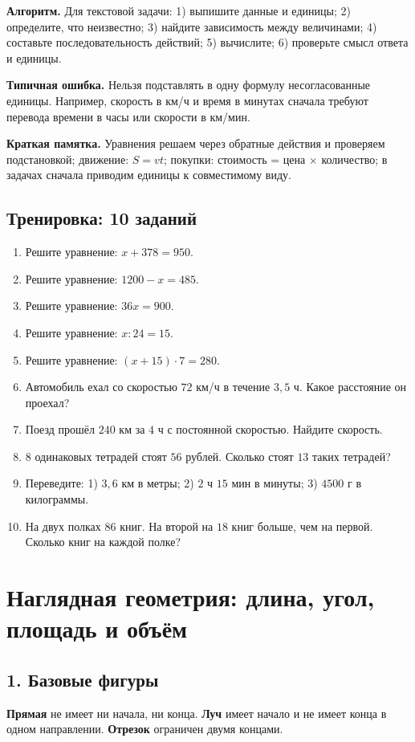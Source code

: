 \documentclass[12pt,a4paper]{article}
\newcommand{\term}[1]{\textbf{\textcolor{graphite}{#1}}}
\newcommand{\algorithm}[1]{%
  \par\smallskip
  {\color{accent}\textbf{Алгоритм.}} #1\par\smallskip
}
\newcommand{\mistake}[1]{%
  \par\smallskip
  {\color{accent}\textbf{Типичная ошибка.}} #1\par\smallskip
}
\newcommand{\memo}[1]{%
  \par\smallskip
  \begingroup
  \setlength{\fboxsep}{7pt}%
  \colorbox{accentlight}{\parbox{0.94\textwidth}{\textbf{Краткая памятка.} #1}}%
  \endgroup
  \par\smallskip
}
\newcommand{\trainingtitle}{\subsection*{Тренировка: 10 заданий}}
\begin{document}
\algorithm{Для текстовой задачи: 1) выпишите данные и единицы; 2) определите, что неизвестно; 3) найдите зависимость между величинами; 4) составьте последовательность действий; 5) вычислите; 6) проверьте смысл ответа и единицы.}

\mistake{Нельзя подставлять в одну формулу несогласованные единицы. Например, скорость в км/ч и время в минутах сначала требуют перевода времени в часы или скорости в км/мин.}

\memo{Уравнения решаем через обратные действия и проверяем подстановкой; движение: $S=vt$; покупки: стоимость = цена $\times$ количество; в задачах сначала приводим единицы к совместимому виду.}

\trainingtitle
\begin{enumerate}
  \item Решите уравнение: $x+378=950$.
  \item Решите уравнение: $1200-x=485$.
  \item Решите уравнение: $36x=900$.
  \item Решите уравнение: $x:24=15$.
  \item Решите уравнение: $(x+15)\cdot7=280$.
  \item Автомобиль ехал со скоростью $72$ км/ч в течение $3{,}5$ ч. Какое расстояние он проехал?
  \item Поезд прошёл $240$ км за $4$ ч с постоянной скоростью. Найдите скорость.
  \item $8$ одинаковых тетрадей стоят $56$ рублей. Сколько стоят $13$ таких тетрадей?
  \item Переведите: 1) $3{,}6$ км в метры; 2) $2$ ч $15$ мин в минуты; 3) $4500$ г в килограммы.
  \item На двух полках $86$ книг. На второй на $18$ книг больше, чем на первой. Сколько книг на каждой полке?
\end{enumerate}

\newpage

\section{Наглядная геометрия: длина, угол, площадь и объём}

\subsection*{1. Базовые фигуры}
\term{Прямая} не имеет ни начала, ни конца. \term{Луч} имеет начало и не имеет конца в одном направлении. \term{Отрезок} ограничен двумя концами.
\end{document}
